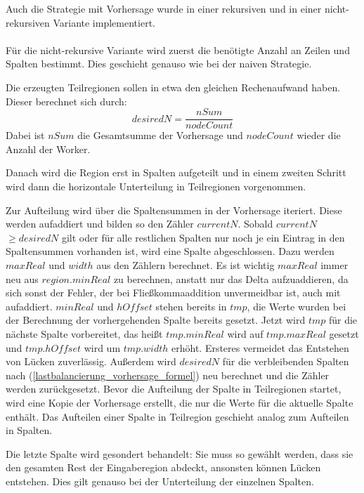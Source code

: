 Auch die Strategie mit Vorhersage wurde in einer rekursiven und in einer nicht-rekursiven Variante implementiert.

\paragraph*{} \label{lastbalancierung_vorhersage}
Für die nicht-rekursive Variante wird zuerst die benötigte Anzahl an Zeilen und Spalten bestimmt.
Dies geschieht genauso wie bei der naiven Strategie.

Die erzeugten Teilregionen sollen in etwa den gleichen Rechenaufwand haben. Dieser berechnet sich durch:
\begin{equation} \label{lastbalancierung_vorhersage_formel}
	desiredN = \frac{nSum}{nodeCount}
\end{equation}
Dabei ist $nSum$ die Gesamtsumme der Vorhersage und $nodeCount$ wieder die Anzahl der Worker.

Danach wird die Region erst in Spalten aufgeteilt und in einem zweiten Schritt wird dann die horizontale Unterteilung in Teilregionen vorgenommen. 

Zur Aufteilung wird über die Spaltensummen in der Vorhersage iteriert. Diese werden aufaddiert und bilden so den Zähler $currentN$.
Sobald $currentN$ $\geq desiredN$ gilt oder für alle restlichen Spalten nur noch je ein Eintrag in den Spaltensummen vorhanden ist, wird eine Spalte abgeschlossen.
Dazu werden $maxReal$ und $width$ aus den Zählern berechnet. Es ist wichtig $maxReal$ immer neu aus $region.minReal$ zu berechnen, anstatt nur das Delta aufzuaddieren, da sich sonst der Fehler, der bei Fließkommaaddition unvermeidbar ist, auch mit aufaddiert. $minReal$ und $hOffset$ stehen bereits in $tmp$, die Werte wurden bei der Berechnung der vorhergehenden Spalte bereits gesetzt.
Jetzt wird $tmp$ für die nächste Spalte vorbereitet, das heißt $tmp.minReal$ wird auf $tmp.maxReal$ gesetzt und $tmp.hOffset$ wird um $tmp.width$ erhöht. Ersteres vermeidet das Entstehen von Lücken zuverlässig.
Außerdem wird $desiredN$ für die verbleibenden Spalten nach (\ref{lastbalancierung_vorhersage_formel}) neu berechnet und die Zähler werden zurückgesetzt.
Bevor die Aufteilung der Spalte in Teilregionen startet, wird eine Kopie der Vorhersage erstellt, die nur die Werte für die aktuelle Spalte enthält.
Das Aufteilen einer Spalte in Teilregion geschieht analog zum Aufteilen in Spalten.

Die letzte Spalte wird gesondert behandelt: Sie muss so gewählt werden, dass sie den gesamten Rest der Eingaberegion abdeckt, ansonsten können Lücken entstehen.
Dies gilt genauso bei der Unterteilung der einzelnen Spalten.

